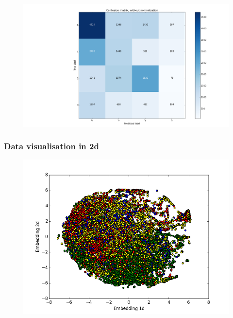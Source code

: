 \documentclass{beamer}
\begin{document}
\begin{frame}
\begin{figure}
\begin{minipage}[b]{0.5\linewidth}
    \vspace{2ex}
  \end{minipage}%
  \begin{minipage}[b]{0.5\linewidth}
    \centering
    \includegraphics[width=1\linewidth]{../REPORT/Figures_Mik/cosSimConfMat2.png} 
    \vspace{2ex}
  \end{minipage} 
\end{figure}
\end{frame}


\begin{frame}
\frametitle{Data visualisation in 2d}
\begin{figure}
\includegraphics[width=0.8\linewidth]{../REPORT/Figures_Mik/embedding2DTrue_labelsColor2.png}  
\end{figure}
\end{frame}
\end{document}
